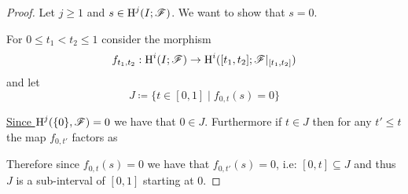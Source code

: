 \documentclass[../../main]{subfiles}
\begin{document}
\begin{proof}
  Let \(j \geq 1\) and \(s \in \operatorname{H}^{j}(I; \mathscr{F})\).
  We want to show that \(s = 0\).

  For \(0 \leq t_{1} < t_{2} \leq 1\) consider the morphism
  \begin{equation*}
    f_{t_{1}, t_{2}}: \operatorname{H}^{i}(I; \mathscr{F}) \to \operatorname{H}^{i}([t_{1}, t_{2}]; \mathscr{F}|_{[t_{1}, t_{2}]})
  \end{equation*}
  and let
  \begin{equation*}
    J \coloneq \{t \in [0, 1] \mid f_{0, t}(s) = 0\}
  \end{equation*}

  \hyperref[ex:cohomology-over-point]{Since \(\operatorname{H}^{j}(\{0\}, \mathscr{F}) = 0\)} we have that \(0 \in J\).
  Furthermore if \(t \in J\) then for any \(t' \leq t\) the map \(f_{0, t'}\) factors as
  \begin{center}
  \end{center}
  Therefore since \(f_{0, t}(s) = 0\) we have that \(f_{0, t'}(s) = 0\), i.e: \([0, t] \subseteq J\) and thus \(J\) is a sub-interval of \([0, 1]\) starting at 0.


\end{proof}
\end{document}
